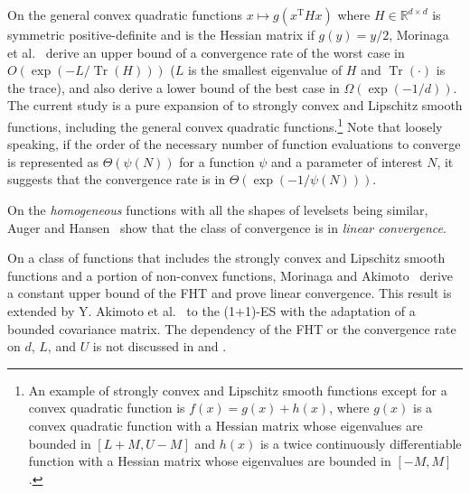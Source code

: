 \documentclass[journal]{IEEEtran}
\DeclareMathOperator{\Tr}{Tr}     %
\providecommand{\R}{\mathbb{R}} %
\theoremstyle{definition}
\begin{document}
On the general convex quadratic functions $x\mapsto g(x^\mathrm{T} H x)$ where { $H\in\R^{d\times d}$ is symmetric positive-definite and is the Hessian matrix if $g(y)=y/2$}, Morinaga et al.~\cite{morinaga2021convergence} derive an upper bound of a convergence rate of the worst case in $O\left(\exp\left(-L/\Tr(H)\right)\right)$ ($L$ is the smallest eigenvalue of $H$ and $\Tr(\cdot)$ is the trace), and also derive a lower bound of the best case in $\Omega\left(\exp\left(-1/d\right)\right)$. 
The current study is a pure expansion of \cite{morinaga2021convergence} to strongly convex and Lipschitz smooth functions, including the general convex quadratic functions.\footnote{An example of strongly convex and Lipschitz smooth functions except for a convex quadratic function is $f(x) = g(x) + h(x)$, where $g(x)$ is a convex quadratic function with a Hessian matrix whose eigenvalues are bounded in $[L+M, U-M]$ and $h(x)$ is a twice continuously differentiable function with a Hessian matrix whose eigenvalues are bounded in $[-M, M]$.}
Note that loosely speaking, if the order of the necessary number of function evaluations to converge is represented as $\Theta(\psi(N))$ for a function $\psi$ and a parameter of interest $N$, it suggests that the convergence rate is in $\Theta\left(\exp(-1/\psi(N))\right)$.

On the \emph{homogeneous} functions with all the shapes of levelsets being similar, Auger and Hansen~\cite{auger2013linear} show that the class of convergence is in \emph{linear convergence}. 


On a class of functions that includes the strongly convex and Lipschitz smooth functions and a portion of non-convex functions, Morinaga and Akimoto~\cite{morinaga2019generalized} derive a constant upper bound of the FHT and prove linear convergence.
This result is extended by Y. Akimoto et al.~\cite{akimoto2020global} to the (1+1)-ES with the adaptation of a bounded covariance matrix.
{The dependency of the FHT or the convergence rate on $d$, $L$, and $U$ is not discussed in \cite{akimoto2020global} and \cite{morinaga2019generalized}}.
    
\end{document}
